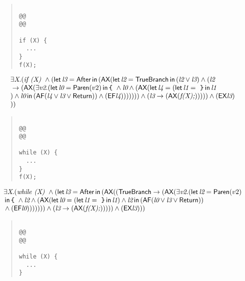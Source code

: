 \documentclass{article}
\newcommand{\AX}{\mbox{\sf{AX}}}
\newcommand{\EX}{\mbox{\sf{EX}}}
\newcommand{\AF}{\mbox{\sf{AF}}}
\newcommand{\EF}{\mbox{\sf{EF}}}
\newcommand{\mita}[1]{\mbox{\it{{#1}}}}
\newcommand{\msf}[1]{\mbox{\sf{{#1}}}}
\newcommand{\ttlb}{\mbox{\tt \char'173}}
\newcommand{\ttrb}{\mbox{\tt \char'175}}
\begin{document}
\begin{quote}\begin{verbatim}

@@
@@

if (X) {
  ...
}
f(X);
\end{verbatim}\end{quote}

\[\begin{array}{l}
\exists \mita{X} . (\mita{if (X) } \wedge (\mita{\sf{let}} \, \mita{l3} = \msf{After} \, \mita{\sf{in}} \, (\AX(\mita{\sf{let}} \, \mita{l2} = \msf{TrueBranch} \, \mita{\sf{in}} \, (\mita{l2} \vee \mita{l3}) \wedge (\mita{l2}\\\mbox{} \rightarrow (\AX(\exists \mita{v2} . (\mita{\sf{let}} \, \mita{l0} = \msf{Paren}(v2) \, \mita{\sf{in}} \, \mita{{\ttlb}
  } \wedge \mita{l0} \wedge (\AX(\mita{\sf{let}} \, \mita{l4} = (\mita{\sf{let}} \, \mita{l1} = \mita{
{\ttrb}} \, \mita{\sf{in}} \, \mita{l1}\\\mbox{}
) \wedge \mita{l0} \, \mita{\sf{in}} \, (\AF(\mita{l4} \vee \mita{l3} \vee \msf{Return})) \wedge (\EF\mita{l4})
))
)))) \wedge (\mita{l3} \rightarrow (\AX(\mita{f(X);})))
)) \wedge (\EX\mita{l3})\\\mbox{}
))
\end{array}\]

\begin{quote}\begin{verbatim}

@@
@@

while (X) {
  ...
}
f(X);
\end{verbatim}\end{quote}

\[\begin{array}{l}
\exists \mita{X} . (\mita{while (X) } \wedge (\mita{\sf{let}} \, \mita{l3} = \msf{After} \, \mita{\sf{in}} \, (\AX((\msf{TrueBranch} \rightarrow (\AX(\exists \mita{v2} . (\mita{\sf{let}} \, \mita{l2} = \msf{Paren}(v2)\\\mbox{} \, \mita{\sf{in}} \, \mita{{\ttlb}
  } \wedge \mita{l2} \wedge (\AX(\mita{\sf{let}} \, \mita{l0} = (\mita{\sf{let}} \, \mita{l1} = \mita{
{\ttrb}} \, \mita{\sf{in}} \, \mita{l1}
) \wedge \mita{l2} \, \mita{\sf{in}} \, (\AF(\mita{l0} \vee \mita{l3} \vee \msf{Return}))\\\mbox{} \wedge (\EF\mita{l0})
))
)))) \wedge (\mita{l3} \rightarrow (\AX(\mita{f(X);}))))) \wedge (\EX\mita{l3})
))
\end{array}\]

\begin{quote}\begin{verbatim}

@@
@@

while (X) {
  ...
}
\end{verbatim}\end{quote}
\end{document}
